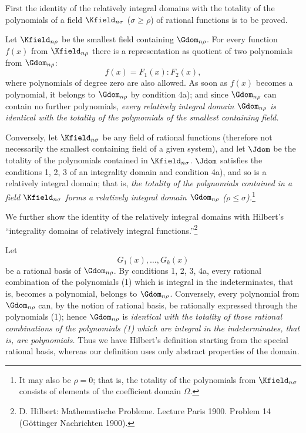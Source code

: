 \documentclass[11pt]{article}
\begin{document}
First the identity of the relatively integral domains with the totality of the polynomials of a field $\Kfield_{n\sigma}$ ($\sigma\ge\rho$) of rational functions is to be proved.

Let $\Kfield_{n\rho}$ be the smallest field containing $\Gdom_{n\rho}$. For every function $f(x)$ from $\Kfield_{n\rho}$ there is a representation as quotient of two polynomials from $\Gdom_{n\rho}$:
\[
  f(x)=F_1(x):F_2(x),
\]
where polynomials of degree zero are also allowed. As soon as $f(x)$ becomes a polynomial, it belongs to $\Gdom_{n\rho}$ by condition 4a); and since $\Gdom_{n\rho}$ can contain no further polynomials, \emph{every relatively integral domain $\Gdom_{n\rho}$ is identical with the totality of the polynomials of the smallest containing field.}

Conversely, let $\Kfield_{n\sigma}$ be any field of rational functions (therefore not necessarily the smallest containing field of a given system), and let $\Jdom$ be the totality of the polynomials contained in $\Kfield_{n\sigma}$. $\Jdom$ satisfies the conditions 1, 2, 3 of an integrality domain and condition 4a), and so is a relatively integral domain; that is, \emph{the totality of the polynomials contained in a field $\Kfield_{n\sigma}$ forms a relatively integral domain $\Gdom_{n\rho}$ ($\rho\le\sigma$).}\footnote{It may also be $\rho=0$; that is, the totality of the polynomials from $\Kfield_{n\sigma}$ consists of elements of the coefficient domain $\Omega$.}

We further show the identity of the relatively integral domains with Hilbert's ``integrality domains of relatively integral functions.''\footnote{D. Hilbert: Mathematische Probleme. Lecture Paris 1900. Problem 14 (Göttinger Nachrichten 1900).}

Let
\begin{equation}
  G_1(x),\ldots,G_k(x)
\tag{1}
\end{equation}
be a rational basis of $\Gdom_{n\rho}$. By conditions 1, 2, 3, 4a, every rational combination of the polynomials (1) which is integral in the indeterminates, that is, becomes a polynomial, belongs to $\Gdom_{n\rho}$. Conversely, every polynomial from $\Gdom_{n\rho}$ can, by the notion of rational basis, be rationally expressed through the polynomials (1); hence $\Gdom_{n\rho}$ is \emph{identical with the totality of those rational combinations of the polynomials (1) which are integral in the indeterminates, that is, are polynomials.} Thus we have Hilbert's definition starting from the special rational basis, whereas our definition uses only abstract properties of the domain.
\end{document}

